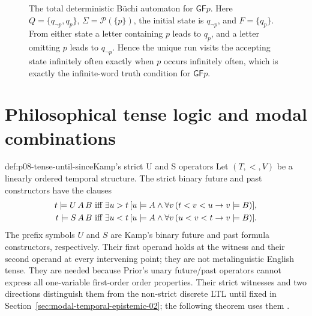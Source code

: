 \begin{figure}[!htbp]
\centering
{}
\caption{The total deterministic B\"uchi automaton for
\(\mathsf G\mathsf Fp\).  Here
\(Q=\{q_{\neg p},q_p\}\), \(\Sigma=\mathcal P(\{p\})\), the initial state is
\(q_{\neg p}\), and \(F=\{q_p\}\).  From either state a letter containing
\(p\) leads to \(q_p\), and a letter omitting \(p\) leads to
\(q_{\neg p}\).  Hence the unique run visits the accepting state infinitely
often exactly when \(p\) occurs infinitely often, which is exactly the
infinite-word truth condition for \(\mathsf G\mathsf Fp\).}
\label{fig:p08-buchi-gfp}
\end{figure}

\section[Philosophical tense logic]{Philosophical tense logic and modal combinations}

\begin{hbdefinition}{def:p08-tense-until-since}{Kamp's strict U and S operators}
Let \((T,<,V)\) be a linearly ordered temporal structure.  The strict binary
future and past constructors have the clauses
\[
\begin{aligned}
 t\models U\,A\,B
 &\text{ iff }
 \exists u>t\,[u\models A\land
   \forall v\,(t<v<u\to v\models B)],\\
 t\models S\,A\,B
 &\text{ iff }
 \exists u<t\,[u\models A\land
   \forall v\,(u<v<t\to v\models B)].
\end{aligned}
\]
The prefix symbols \(U\) and \(S\) are Kamp's binary future and past formula
constructors, respectively.  Their first operand holds at the witness and
their second operand at every intervening point; they are not metalinguistic
English tense.  They
are needed because Prior's unary future/past operators cannot express all
one-variable first-order order properties.  Their strict witnesses and two
directions distinguish them from the non-strict discrete LTL until fixed in
Section~\ref{sec:modal-temporal-epistemic-02}; the following theorem uses them
\cite{Prior1967,Kamp1968}.
\end{hbdefinition}

